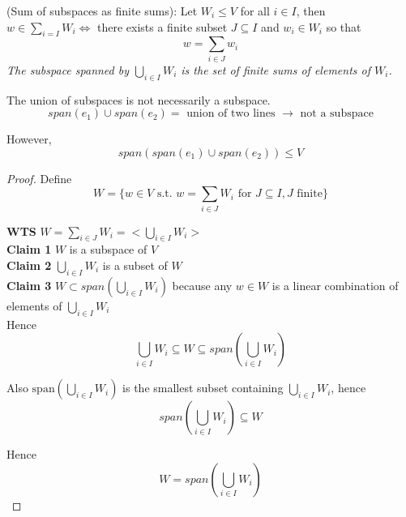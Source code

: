 \begin{proposition}
(Sum of subspaces as finite sums): Let $W_i \leq V$ for all $i \in I$, then $w \in \sum_{i = I} W_i \iff $ there exists a finite subset $J \subseteq I$ and $w_i \in W_i$ so that 
\[
  w = \sum_{i \in J} w_i
\]
\textit{The subspace spanned by $\bigcup_{i \in I} W_i$ is the set of finite sums of elements of $W_i$.}
\end{proposition}

\begin{remark}
The union of subspaces is not necessarily a subspace. 
\[
  span(e_1) \cup span(e_2) = \text{ union of two lines } \rightarrow \text{ not a subspace}
\]

However, 
\[
  span(
    span(e_1) \cup span(e_2) 
  ) \leq V
\]
\end{remark}


\begin{proof}
Define 
\[
  W = \{ w \in V \text{ s.t. } w = \sum_{i \in J} W_i \text{ for } J \subseteq I, J \text{ finite} \} 
\]

\textbf{WTS} $W = \sum_{i \in J} W_i = < \bigcup_{i \in I} W_i> $ \\

\textbf{Claim 1} $W$ is a subspace of $V$ \\

\textbf{Claim 2} $\bigcup_{i \in I} W_i$ is a subset of $W$ \\

\textbf{Claim 3} $W \subset span \left( \bigcup_{i \in I} W_i \right) $ because any $w \in W$ is a linear combination of elements of $\bigcup_{i \in I} W_i $ \\

Hence 
\[
  \bigcup_{i \in I}W_i \subseteq W \subseteq span \left( \bigcup_{i \in I} W_i \right) 
\]

Also $\text{span} \left( \bigcup_{i \in I} W_i \right)$ is the smallest subset containing $\bigcup_{i \in I} W_i$, hence 
\[
  span \left( \bigcup_{i \in I} W_i  \right)  \subseteq W
\]

Hence
\[
  W = span \left(   \bigcup_{i \in I}W_i \right)
\]
\end{proof}

\newpage




